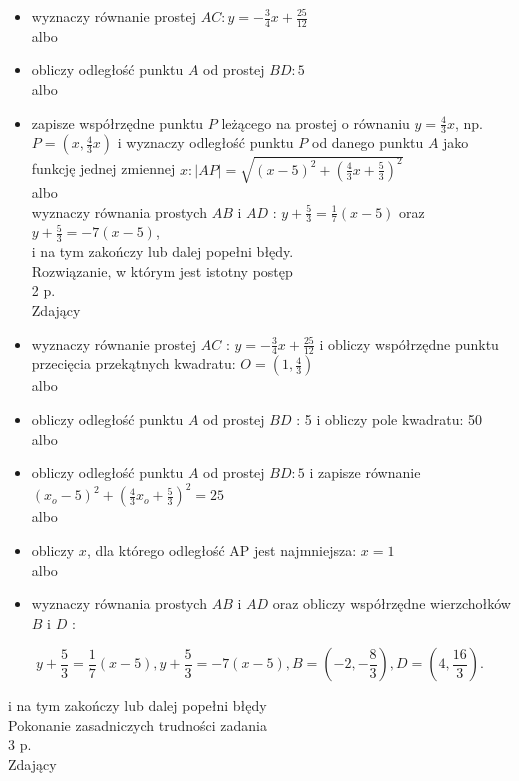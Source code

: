 \documentclass[10pt]{article}
\begin{document}
\begin{itemize}
  \item wyznaczy równanie prostej $A C: y=-\frac{3}{4} x+\frac{25}{12}$\\
albo
  \item obliczy odległość punktu $A$ od prostej $B D: 5$\\
albo
  \item zapisze współrzędne punktu $P$ leżącego na prostej o równaniu $y=\frac{4}{3} x$, np. $P=\left(x, \frac{4}{3} x\right)$ i wyznaczy odległość punktu $P$ od danego punktu $A$ jako funkcję jednej zmiennej $x:|A P|=\sqrt{(x-5)^{2}+\left(\frac{4}{3} x+\frac{5}{3}\right)^{2}}$\\
albo\\
wyznaczy równania prostych $A B$ i $A D$ : $y+\frac{5}{3}=\frac{1}{7}(x-5)$ oraz $y+\frac{5}{3}=-7(x-5)$,\\
i na tym zakończy lub dalej popełni błędy.\\
Rozwiązanie, w którym jest istotny postęp\\
2 p.\\
Zdający
  \item wyznaczy równanie prostej $A C$ : $y=-\frac{3}{4} x+\frac{25}{12}$ i obliczy współrzędne punktu przecięcia przekątnych kwadratu: $O=\left(1, \frac{4}{3}\right)$\\
albo
  \item obliczy odległość punktu $A$ od prostej $B D$ : 5 i obliczy pole kwadratu: 50\\
albo
  \item obliczy odległość punktu $A$ od prostej $B D: 5$ i zapisze równanie $\left(x_{o}-5\right)^{2}+\left(\frac{4}{3} x_{o}+\frac{5}{3}\right)^{2}=25$\\
albo
  \item obliczy $x$, dla którego odległość AP jest najmniejsza: $x=1$\\
albo
  \item wyznaczy równania prostych $A B$ i $A D$ oraz obliczy współrzędne wierzchołków $B$ i $D$ :
\end{itemize}

$$
y+\frac{5}{3}=\frac{1}{7}(x-5), y+\frac{5}{3}=-7(x-5), B=\left(-2,-\frac{8}{3}\right), D=\left(4, \frac{16}{3}\right) .
$$

i na tym zakończy lub dalej popełni błędy\\
Pokonanie zasadniczych trudności zadania\\
3 p.\\
Zdający
\end{document}
